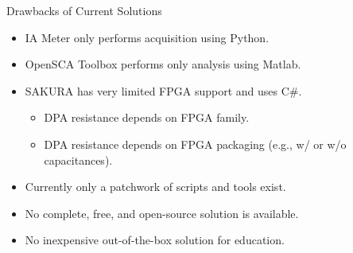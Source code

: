 \documentclass[xcolor=pdftex,dvipsnames,table,final]{beamer}
\begin{document}
\begin{frame}[fragile]{}
\begin{columns}[t]
\begin{column}{.31\linewidth}
\begin{block}{Drawbacks of Current Solutions}
\begin{itemize}
              \item IA Meter only performs acquisition using Python.
              \item OpenSCA Toolbox performs only analysis using Matlab.
              \item SAKURA has very limited FPGA support and uses C\#.
              \begin{itemize}
                \item DPA resistance depends on FPGA family.
                \item DPA resistance depends on FPGA packaging (e.g., w/ or w/o capacitances).
              \end{itemize}
              \item Currently only a patchwork of scripts and tools exist.
              \item No complete, free, and open-source solution is available.
              \item No inexpensive out-of-the-box solution for education.
            \end{itemize}
	    \vspace{0.8ex}
          \end{block}
        
    \end{column}
    \begin{column}{.31\linewidth}
   
      

\end{column}
\end{columns}
\end{frame}
\end{document}
